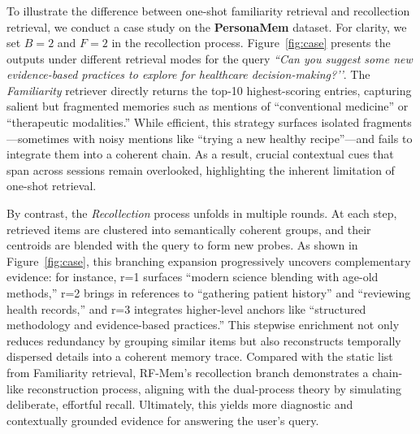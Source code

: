 \subsubsection{}
To illustrate the difference between one-shot familiarity retrieval and recollection retrieval, we conduct a case study on the \textbf{PersonaMem} dataset. For clarity, we set $B=2$ and $F=2$ in the recollection process. Figure~\ref{fig:case} presents the outputs under different retrieval modes for the query \textit{``Can you suggest some new evidence-based practices to explore for healthcare decision-making?’’}. The \emph{Familiarity} retriever directly returns the top-10 highest-scoring entries, capturing salient but fragmented memories such as mentions of ``conventional medicine'' or ``therapeutic modalities.'' While efficient, this strategy surfaces isolated fragments—sometimes with noisy mentions like ``trying a new healthy recipe''—and fails to integrate them into a coherent chain. As a result, crucial contextual cues that span across sessions remain overlooked, highlighting the inherent limitation of one-shot retrieval.

By contrast, the \emph{Recollection} process unfolds in multiple rounds. At each step, retrieved items are clustered into semantically coherent groups, and their centroids are blended with the query to form new probes. As shown in Figure~\ref{fig:case}, this branching expansion progressively uncovers complementary evidence: for instance, r=1 surfaces ``modern science blending with age-old methods,'' r=2 brings in references to ``gathering patient history'' and ``reviewing health records,'' and r=3 integrates higher-level anchors like ``structured methodology and evidence-based practices.'' This stepwise enrichment not only reduces redundancy by grouping similar items but also reconstructs temporally dispersed details into a coherent memory trace. Compared with the static list from Familiarity retrieval, RF-Mem’s recollection branch demonstrates a chain-like reconstruction process, aligning with the dual-process theory by simulating deliberate, effortful recall. Ultimately, this yields more diagnostic and contextually grounded evidence for answering the user’s query.

